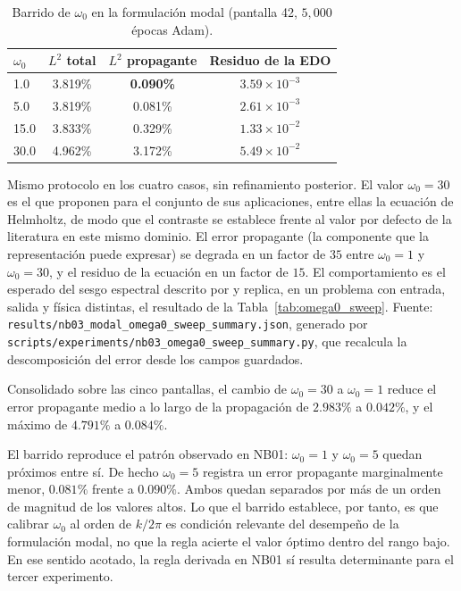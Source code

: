 \begin{table}[htbp]
\centering
\begin{threeparttable}
\caption{Barrido de $\omega_0$ en la formulación modal (pantalla 42, $5{,}000$ épocas Adam).}
\label{tab:nb03_omega0}
\begin{tabular}{lccc}
\toprule
$\omega_0$ & $L^2$ total & $L^2$ propagante & Residuo de la EDO \\
\midrule
1.0  & 3.819\% & \textbf{0.090\%} & $3.59\times10^{-3}$ \\
5.0  & 3.819\% & 0.081\%          & $2.61\times10^{-3}$ \\
15.0 & 3.833\% & 0.329\%          & $1.33\times10^{-2}$ \\
30.0 & 4.962\% & 3.172\%          & $5.49\times10^{-2}$ \\
\bottomrule
\end{tabular}
\begin{tablenotes}\small
    \item Mismo protocolo en los cuatro casos, sin refinamiento posterior. El
    valor $\omega_0=30$ es el que \textcite{sitzmann2020siren} proponen para el
    conjunto de sus aplicaciones, entre ellas la ecuación de Helmholtz, de modo
    que el contraste se establece frente al valor por defecto de la literatura
    en este mismo dominio. El error propagante (la componente que la
    representación puede expresar) se degrada en un factor de $35$ entre
    $\omega_0 = 1$ y $\omega_0 = 30$, y el residuo de la ecuación en un factor
    de $15$. El comportamiento es el esperado del sesgo espectral descrito por
    \textcite{rahaman2019spectral} y replica, en un problema con entrada,
    salida y física distintas, el resultado de la Tabla~\ref{tab:omega0_sweep}.
    Fuente: \texttt{results/nb03\_modal\_omega0\_sweep\_summary.json}, generado
    por \texttt{scripts/experiments/nb03\_omega0\_sweep\_summary.py}, que
    recalcula la descomposición del error desde los campos guardados.
\end{tablenotes}
\end{threeparttable}
\end{table}

Consolidado sobre las cinco pantallas, el cambio de $\omega_0=30$ a
$\omega_0=1$ reduce el error propagante medio a lo largo de la propagación de
$2.983\%$ a $0.042\%$, y el máximo de $4.791\%$ a $0.084\%$.

El barrido reproduce el patrón observado en NB01: $\omega_0 = 1$ y $\omega_0 = 5$ quedan próximos entre sí. De hecho $\omega_0 = 5$ registra un error propagante marginalmente menor, $0.081\%$ frente a $0.090\%$. Ambos quedan separados por más de un orden de magnitud de los valores altos. Lo que el
barrido establece, por tanto, es que calibrar $\omega_0$ al orden de
$k/2\pi$ es condición relevante del desempeño de la formulación modal, no que
la regla acierte el valor óptimo dentro del rango bajo. En ese sentido acotado,
la regla derivada en NB01 sí resulta determinante para el tercer experimento.

